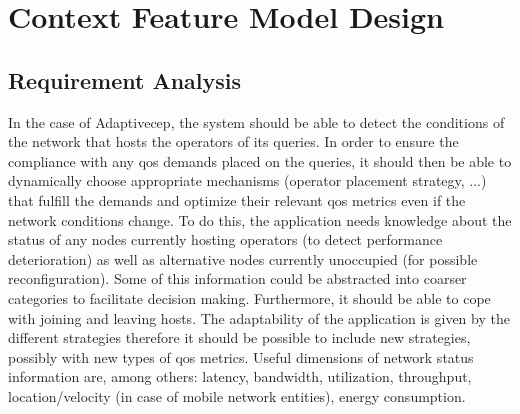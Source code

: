 

\section{Context Feature Model Design}
\subsection{Requirement Analysis}
In the case of Adaptive\gls{cep}, the system should be able to detect the conditions of the network that hosts the operators of its queries. In order to ensure the compliance with any \gls{qos} demands placed on the queries, it should then be able to dynamically choose appropriate mechanisms (operator placement strategy, ...) that fulfill the demands and optimize their relevant \gls{qos} metrics even if the network conditions change. 
To do this, the application needs knowledge about the status of any nodes currently hosting operators (to detect performance deterioration) as well as alternative nodes currently unoccupied (for possible reconfiguration).
Some of this information could be abstracted into coarser categories to facilitate decision making.
Furthermore, it should be able to cope with joining and leaving hosts. 
The adaptability of the application is given by the different strategies therefore it should be possible to include new strategies, possibly with new types of \gls{qos} metrics. Useful dimensions of network status information are, among others: latency, bandwidth, utilization, throughput, location/velocity (in case of mobile network entities), energy consumption.

